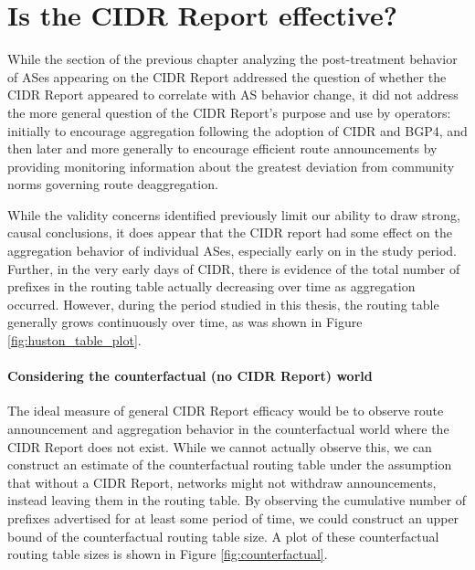 \section{Is the CIDR Report effective?}

While the section of the previous chapter analyzing the post-treatment behavior
of ASes appearing on the CIDR Report addressed the question of whether the CIDR
Report appeared to correlate with AS behavior change, it did not address the
more general question of the CIDR Report's purpose and use by operators:
initially to encourage aggregation following the adoption of CIDR and BGP4,
and then later and more generally to encourage efficient route announcements by
providing monitoring information about the greatest deviation from community
norms governing route deaggregation.

While the validity concerns identified previously limit our ability to draw
strong, causal conclusions, it does appear that the CIDR report had some effect
on the aggregation behavior of individual ASes, especially early on in the
study period. Further, in the very early days of CIDR, there is evidence of the
total number of prefixes in the routing table actually decreasing over time as
aggregation occurred. However, during the period studied in this thesis, the
routing table generally grows continuously over time, as was shown in Figure
\ref{fig:huston_table_plot}.

\paragraph{Considering the counterfactual (no CIDR Report) world}

The ideal measure of general CIDR Report efficacy would be to observe route
announcement and aggregation behavior in the counterfactual world where the
CIDR Report does not exist. While we cannot actually observe this, we can
construct an estimate of the counterfactual routing table under the assumption
that without a CIDR Report, networks might not withdraw announcements, instead
leaving them in the routing table. By observing the cumulative number of
prefixes advertised for at least some period of time, we could construct an
upper bound of the counterfactual routing table size. A plot of these
counterfactual routing table sizes is shown in Figure \ref{fig:counterfactual}.

